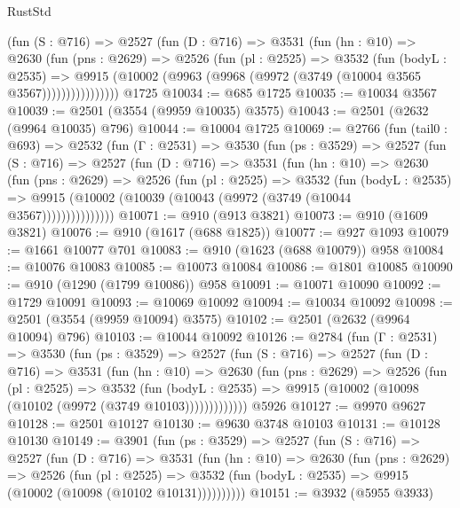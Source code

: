 \begin{lexlean}{RustStd}
\begin{coremodule}
            (fun (S : @716) =>
            @2527
              (fun (D : @716) =>
              @3531
                (fun (hn : @10) =>
                @2630
                  (fun (pns : @2629) =>
                  @2526
                    (fun (pl : @2525) =>
                    @3532
                      (fun (bodyL : @2535) =>
                      @9915 (@10002 (@9963 (@9968 (@9972 (@3749 (@10004 @3565 @3567))))))))))))))))
    @1725
@10034 := @685 @1725
@10035 := @10034 @3567
@10039 := @2501 (@3554 (@9959 @10035) @3575)
@10043 := @2501 (@2632 (@9964 @10035) @796)
@10044 := @10004 @1725
@10069 := @2766
    (fun (tail0 : @693) =>
    @2532
      (fun (Γ : @2531) =>
      @3530
        (fun (ps : @3529) =>
        @2527
          (fun (S : @716) =>
          @2527
            (fun (D : @716) =>
            @3531
              (fun (hn : @10) =>
              @2630
                (fun (pns : @2629) =>
                @2526
                  (fun (pl : @2525) =>
                  @3532
                    (fun (bodyL : @2535) =>
                    @9915 (@10002 (@10039 (@10043 (@9972 (@3749 (@10044 @3567)))))))))))))))
@10071 := @910 (@913 @3821)
@10073 := @910 (@1609 @3821)
@10076 := @910 (@1617 (@688 @1825))
@10077 := @927 @1093
@10079 := @1661 @10077 @701
@10083 := @910 (@1623 (@688 @10079)) @958
@10084 := @10076 @10083
@10085 := @10073 @10084
@10086 := @1801 @10085
@10090 := @910 (@1290 (@1799 @10086)) @958
@10091 := @10071 @10090
@10092 := @1729 @10091
@10093 := @10069 @10092
@10094 := @10034 @10092
@10098 := @2501 (@3554 (@9959 @10094) @3575)
@10102 := @2501 (@2632 (@9964 @10094) @796)
@10103 := @10044 @10092
@10126 := @2784
    (fun (Γ : @2531) =>
    @3530
      (fun (ps : @3529) =>
      @2527
        (fun (S : @716) =>
        @2527
          (fun (D : @716) =>
          @3531
            (fun (hn : @10) =>
            @2630
              (fun (pns : @2629) =>
              @2526
                (fun (pl : @2525) =>
                @3532
                  (fun (bodyL : @2535) =>
                  @9915 (@10002 (@10098 (@10102 (@9972 (@3749 @10103)))))))))))))
    @5926
@10127 := @9970 @9627
@10128 := @2501 @10127
@10130 := @9630 @3748 @10103
@10131 := @10128 @10130
@10149 := @3901
    (fun (ps : @3529) =>
    @2527
      (fun (S : @716) =>
      @2527
        (fun (D : @716) =>
        @3531
          (fun (hn : @10) =>
          @2630
            (fun (pns : @2629) =>
            @2526
              (fun (pl : @2525) =>
              @3532 (fun (bodyL : @2535) => @9915 (@10002 (@10098 (@10102 @10131))))))))))
@10151 := @3932 (@5955 @3933)

\end{coremodule}
\end{lexlean}
